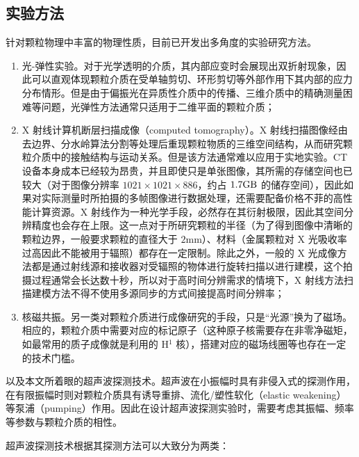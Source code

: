 \subsection{实验方法}

针对颗粒物理中丰富的物理性质，目前已开发出多角度的实验研究方法。

\begin{enumerate}
  \item 光-弹性实验\cite{photoelasticimetry}。对于光学透明的介质，其内部应变时会展现出双折射现象，因此可以直观体现颗粒介质在受单轴剪切、环形剪切等外部作用下其内部的应力分布情形。但是由于偏振光在异质性介质中的传播、三维介质中的精确测量困难等问题\cite{Non-Destructive_3D_Photoelasticity}，光弹性方法通常只适用于二维平面的颗粒介质；
  \item X 射线计算机断层扫描成像（computed tomography）\cite{PhysRevE.68.020301}。X 射线扫描图像经由去边界、分水岭算法分割等处理后重现颗粒物质的三维空间结构，从而研究颗粒介质中的接触结构与运动关系。但是该方法通常难以应用于实地实验。CT 设备本身成本已经较为昂贵，并且即使只是单张图像，其所需的存储空间也已较大（对于图像分辨率 $1021\times 1021 \times 886$，约占 $1.7\unit{\giga\byte}$ 的储存空间），因此如果对实际测量时所拍摄的多帧图像进行数据处理，还需要配备价格不菲的高性能计算资源。X 射线作为一种光学手段，必然存在其衍射极限，因此其空间分辨精度也会存在上限。这一点对于所研究颗粒的半径（为了得到图像中清晰的颗粒边界，一般要求颗粒的直径大于 $2\unit{\milli\meter}$）、材料（金属颗粒对 X 光吸收率过高因此不能被用于辐照）都存在一定限制。除此之外，一般的 X 光成像方法都是通过射线源和接收器对受辐照的物体进行旋转扫描以进行建模，这个拍摄过程通常会长达数十秒，所以对于高时间分辨需求的情境下，X 射线方法扫描建模方法不得不使用多源同步\cite{wang2008ultrafast}的方式间接提高时间分辨率；
  \item 核磁共振\cite{CLARKE2023}。另一类对颗粒介质进行成像研究的手段，只是“光源”换为了磁场。相应的，颗粒介质中需要对应的标记原子（这种原子核需要存在非零净磁矩，如最常用的质子成像就是利用的 H$^{1}$ 核），搭建对应的磁场线圈等也存在一定的技术门槛。
\end{enumerate}

以及本文所着眼的超声波探测技术。超声波在小振幅时具有非侵入式的探测作用，在有限振幅时则对颗粒介质具有诱导重排\cite{PhysRevE.84.020301}、流化/塑性软化（elastic weakening）\cite{PhysRevE.84.020301}等泵浦（pumping）作用。因此在设计超声波探测实验时，需要考虑其振幅、频率等参数与颗粒介质的相性。

超声波探测技术根据其探测方法可以大致分为两类：

